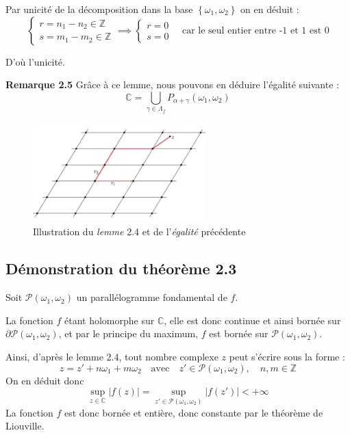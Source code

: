 \documentclass{article}
\begin{document}
Par unicité de la décomposition dans la base ${\left\{ \omega_1, \omega_2\right\}}$ on en déduit :
\[
\begin{cases}
r = n_1 - n_2 \in \mathbb{Z} \\
s = m_1 - m_2 \in \mathbb{Z}
\end{cases}
\implies
\begin{cases}
r = 0 \\
s = 0
\end{cases}
\quad \text{car le seul entier entre -1 et 1 est 0}
\]

D'où l'unicité.

\textbf{Remarque 2.5}
Grâce à ce lemme, nous pouvons en déduire l'égalité suivante :
\[
\mathbb{C} = \bigcup_{\gamma \in \Lambda_{f}} P_{\alpha + \gamma} (\omega_1, \omega_2)
\]
\begin{figure}[h]
    \centering
    \includegraphics[width=0.6\textwidth]{lemme.jpeg}
    \caption{Illustration du \textit{lemme} 2.4 et de l'\textit{égalité} précédente}
\end{figure}



\subsection{Démonstration du théorème 2.3}

Soit $\mathcal{P}(\omega_1, \omega_2)$ un parallélogramme fondamental de $f$.

La fonction $f$ étant holomorphe sur $\mathbb{C}$, elle est donc continue et ainsi bornée sur $\partial \mathcal{P}(\omega_1, \omega_2)$, et par le principe du maximum, $f$ est bornée sur $\mathcal{P}(\omega_1, \omega_2)$.

Ainsi, d'après le lemme 2.4, tout nombre complexe $z$ peut s'écrire sous la forme :
\[
z = z' + n \omega_1 + m \omega_2 \quad \text{avec} \quad z' \in \mathcal{P}(\omega_1, \omega_2), \quad n, m \in \mathbb{Z}
\]
On en déduit donc
\[
\sup_{z \in \mathbb{C}} |f(z)| = \sup_{z' \in \mathcal{P}(\omega_1, \omega_2)} |f(z')| < +\infty
\]
La fonction $f$ est donc bornée et entière, donc constante par le théorème de Liouville.
\end{document}
